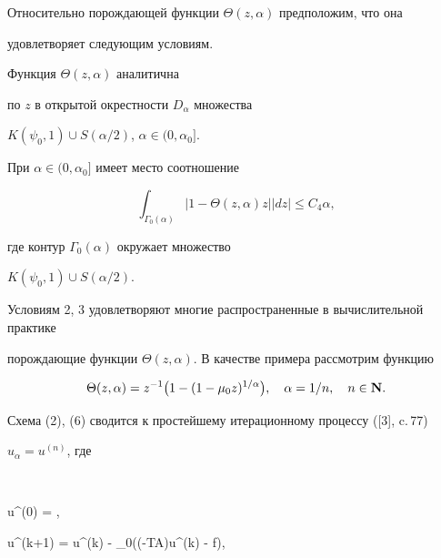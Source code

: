 Относительно порождающей функции $\Theta(z, \alpha)$ предположим, что она 


удовлетворяет следующим условиям.





\begin{cond}


Функция $\Theta(z,\alpha)$ аналитична


по $z$ в открытой окрестности $D_{\alpha}$ множества


$K(\psi_0, 1)\cup S(\alpha/2)$, $\alpha\in(0,\alpha_0]$.


\end{cond}





\begin{cond}


При $\alpha\in(0,\alpha_0]$ имеет место соотношение


$$


\int_{\Gamma_0(\alpha)} | 1 - \Theta(z,\alpha)z |


| dz | \leq C_4\alpha,


$$


где контур $\Gamma_0(\alpha)$ окружает множество


$K(\psi_0, 1)\cup S(\alpha/2)$. 


\end{cond}





Условиям 2, 3 удовлетворяют многие распространенные в вычислительной практике


порождающие функции $\Theta(z, \alpha)$. В качестве примера рассмотрим функцию


\begin{equation}


\Theta (z,\alpha) =


z^{-1}\big(1 - (1-\mu_0 z)^{1/\alpha}\big),


\quad\alpha=1/n,\quad n\in {\bold N}.


\end{equation}


Схема (2), (6) сводится к простейшему итерационному процессу ([3], c.\,77) 


$u_\alpha=u^{(n)}$, где


$$


u^{(0)} = \xi, \quad


u^{(k+1)} = u^{(k)} - \mu_0(\exp(-TA)u^{(k)} - f),


